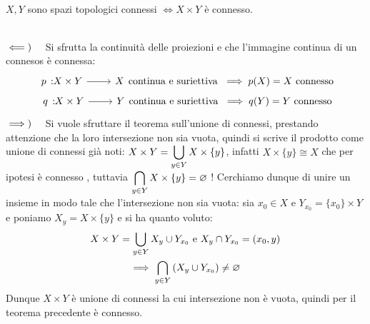 \begin{theorema}~{}\\ \label{prodotto connessi}
	$X, Y$ sono spazi topologici connessi $\iff X\times Y$ è connesso.	
\end{theorema}
\begin{demonstration}~{}\\
	$\impliedby)\quad$ Si sfrutta la continuità delle proiezioni e che l'immagine continua di un connesos è connessa:
		\begin{gather*}
			\funz p {X\times Y} X \text{continua e suriettiva } \implies p(X)=X \text{ connesso}\\
			\funz q {X\times Y} Y \text{continua e suriettiva } \implies q(Y)=Y \text{ connesso}	
		\end{gather*}	
	$\implies)\quad$ Si vuole sfruttare il teorema sull'unione di connessi, prestando attenzione che la loro intersezione non sia vuota, quindi si scrive il prodotto come unione di connessi già noti:
	$\displaystyle X\times Y=\mathop{{\bigcup}}\displaylimits_{y\in Y}X\times\{y\}$, infatti $X\times\{y\}\cong X$ che per ipotesi è connesso , tuttavia $\displaystyle\mathop{{\bigcap}}\displaylimits_{y\in Y}X\times\{y\}=\varnothing$ !\newline
	Cerchiamo dunque di unire un insieme in modo tale che l'intersezione non sia vuota: sia $x_0\in X$ e $Y_{x_0}=\{x_0\}\times Y$ e poniamo $X_y=X\times\{y\}$ e si ha quanto voluto:
		\begin{gather*}
			X\times Y=\mathop{{\bigcup}}\displaylimits_{y\in Y}X_y \cup Y_{x_0} \text{ e } X_y\cap Y_{x_0}=(x_0,y)\\
			\implies \mathop{{\bigcap}}\displaylimits_{y\in Y}\left( X_y  \cup Y_{x_0}\right)\neq\varnothing		
		\end{gather*}
	Dunque $X\times Y$ è unione di connessi la cui intersezione non è vuota, quindi per il teorema precedente è connesso.
\end{demonstration}
